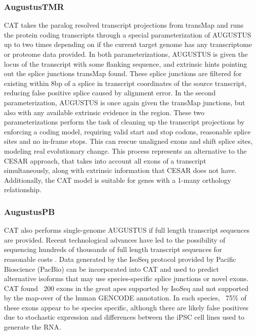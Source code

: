 \documentclass[fleqn,10pt]{wlscirep}
\begin{document}
\subsubsection{AugustusTMR}

CAT takes the paralog resolved transcript projections from transMap and runs the protein coding transcripts through a special parameterization of AUGUSTUS up to two times depending on if the current target genome has any transcriptome or proteome data provided. In both parameterizations, AUGUSTUS is given the locus of the transcript with some flanking sequence, and extrinsic hints pointing out the splice junctions transMap found. These splice junctions are filtered for existing within 8bp of a splice in transcript coordinates of the source transcript, reducing false positive splice caused by alignment error. In the second parameterization, AUGUSTUS is once again given the transMap junctions, but also with any available extrinsic evidence in the region. These two parameterizations perform the task of cleaning up the transcript projections by enforcing a coding model, requiring valid start and stop codons, reasonable splice sites and no in-frame stops. This can rescue unaligned exons and shift splice sites, modeling real evolutionary change. This process represents an alternative to the CESAR approach, that takes into account all exons of a transcript simultaneously, along with extrinsic information that CESAR does not have. Additionally, the CAT model is suitable for genes with a 1-many orthology relationship.

\subsubsection{AugustusPB}
CAT also performs single-genome AUGUSTUS if full length transcript sequences are provided. Recent technological advances have led to the possibility of sequencing hundreds of thousands of full length transcript sequences for reasonable costs \cite{korlach2017novo}. Data generated by the IsoSeq protocol provided by Pacific Bioscience (PacBio) \cite{gonzalez2016introduction} can be incorporated into CAT and used to predict alternative isoforms that may use species-specific splice junctions or novel exons. CAT found ~200 exons in the great apes supported by IsoSeq and not supported by the map-over of the human GENCODE annotation. In each species, ~75\% of these exons appear to be species specific, although there are likely false positives due to stochastic expression and differences between the iPSC cell lines used to generate the RNA.
\end{document}
